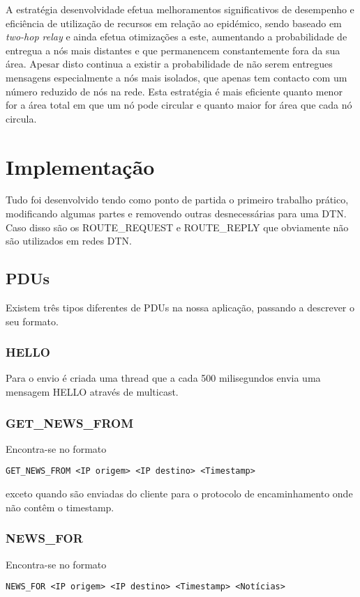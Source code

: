 \documentclass{llncs}
\begin{document}
A estratégia desenvolvidade efetua melhoramentos significativos de desempenho e eficiência de utilização de recursos em relação ao epidémico, sendo baseado em \emph{two-hop relay} e ainda efetua otimizações a este, aumentando a probabilidade de entregua a nós mais distantes e que permanencem constantemente fora da sua área. Apesar disto continua a existir a probabilidade de não serem entregues mensagens especialmente a nós mais isolados, que apenas tem contacto com um número reduzido de nós na rede. Esta estratégia é mais eficiente quanto menor for a área total em que um nó pode circular e quanto maior for área que cada nó circula.

\clearpage

\section{Implementação}

Tudo foi desenvolvido tendo como ponto de partida o primeiro trabalho prático, modificando algumas partes e removendo outras desnecessárias para uma DTN. Caso disso são os ROUTE\_REQUEST e ROUTE\_REPLY que obviamente não são utilizados em redes DTN.

\subsection{PDUs}

Existem três tipos diferentes de PDUs na nossa aplicação, passando a descrever o seu formato.

\subsubsection{HELLO} Para o envio é criada uma thread que a cada 500 milisegundos envia uma mensagem HELLO através de multicast.

\subsubsection{GET\_NEWS\_FROM} Encontra-se no formato \begin{verbatim}GET_NEWS_FROM <IP origem> <IP destino> <Timestamp>\end{verbatim} exceto quando são enviadas do cliente para o protocolo de encaminhamento onde não contêm o timestamp.

\subsubsection{NEWS\_FOR} Encontra-se no formato \begin{verbatim}NEWS_FOR <IP origem> <IP destino> <Timestamp> <Notícias>\end{verbatim}
\end{document}
